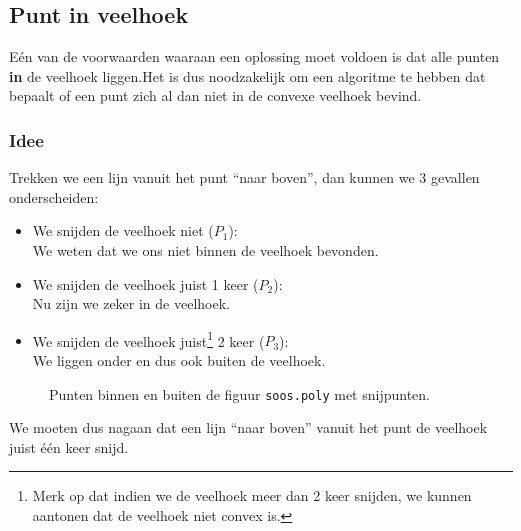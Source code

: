 \subsection{Punt in veelhoek}
\label{sub:algo-pt-in-poly}
Eén van de voorwaarden waaraan een oplossing moet voldoen is dat alle punten \textbf{in} de veelhoek liggen.Het is dus noodzakelijk om een algoritme te hebben dat bepaalt of een punt zich al dan niet in de convexe veelhoek bevind.
\subsubsection{Idee}
Trekken we een lijn vanuit het punt ``naar boven'', dan kunnen we 3 gevallen onderscheiden:
\begin{itemize}
\item We snijden de veelhoek niet ($P_{1}$): \\
		We weten dat we ons niet binnen de veelhoek bevonden.
\item We snijden de veelhoek juist 1 keer ($P_{2}$):\\
		Nu zijn we zeker in de veelhoek.
\item We snijden de veelhoek juist\footnote{Merk op dat indien we de veelhoek meer dan 2 keer snijden, we kunnen aantonen dat de veelhoek niet convex is.} 2 keer ($P_{3}$):\\
		We liggen onder en dus ook buiten de veelhoek.
\end{itemize}

\begin{center}
\begin{figure}[H]
\centering
{}
\caption{Punten binnen en buiten de figuur \texttt{soos.poly} met snijpunten.}
\end{figure}
\end{center}
We moeten dus nagaan dat een lijn ``naar boven'' vanuit het punt de veelhoek
juist één keer snijd.


